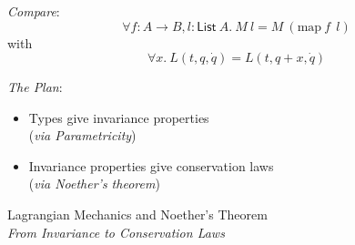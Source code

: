 \documentclass[xetex,serif,mathserif]{beamer}
\newenvironment{slide}[1]{\begin{frame}\frametitle{#1}}{\end{frame}}
\begin{document}
\begin{slide}{}
  \textcolor{titlered}{\emph{Compare}}:
  \begin{displaymath}
    \forall f : A \to B, l : \mathsf{List}~A.~M~l = M~(\mathrm{map}~f~~l)
  \end{displaymath}
  \quad with
  \begin{displaymath}
    \forall x.~L(t, q, \dot{q}) = L(t, q + x, \dot{q})
  \end{displaymath}

  \bigskip

  \textcolor{titlered}{\emph{The Plan}}:
  \begin{itemize}
  \item Types give invariance properties \\ \hspace{6cm} \textcolor{black!60}{(\emph{via Parametricity})}
  \item Invariance properties give conservation laws \\ \hspace{6cm} \textcolor{black!60}{(\emph{via Noether’s theorem})}
  \end{itemize}
\end{slide}

\begin{frame}
  \begin{center}
    {Lagrangian Mechanics and Noether's Theorem} \\
    \pause
    \textcolor{black!60}{\emph{From Invariance to Conservation Laws}}
  \end{center}
\end{frame}
\end{document}
